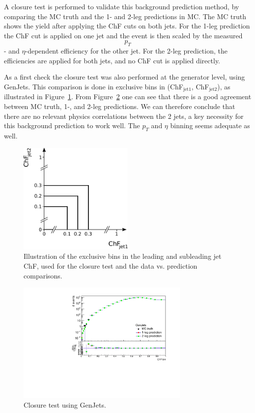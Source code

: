 A closure test is performed to validate this background prediction method, by comparing the MC truth and the 1- and 2-leg predictions in MC. The MC truth shows the yield after applying the ChF cuts on both jets. For the 1-leg prediction the ChF cut is applied on one jet and the event is then scaled by the measured $$p_T$$- and $\eta$-dependent efficiency for the other jet. For the 2-leg prediction, the efficiencies are applied for both jets, and no ChF cut is applied directly.

As a first check the closure test was also performed at the generator level, using GenJets. This comparison is done in exclusive bins in (ChF$_{\mathrm{jet 1}}$, ChF$_{\mathrm{jet 2}}$), as illustrated in Figure~\ref{fig:excl_binning}. From Figure~\ref{fig:closuretest_GenJets} one can see that there is a good agreement between MC truth, 1-, and 2-leg predictions. We can therefore conclude that there are no relevant physics correlations between the 2 jets, a key necessity for this background prediction to work well. The $p_T$ and $\eta$ binning seems adequate as well.

\begin{figure}[h]
  \centering
  \includegraphics[width=0.5\textwidth]{figures/exclusive_binning.pdf}\hfill%
  \caption{Illustration of the exclusive bins in the leading and subleading jet ChF, used for the closure test and the data vs. prediction comparisons.}
  \label{fig:excl_binning}
\end{figure}

\begin{figure}[h]
  \centering
  \includegraphics[width=0.75\textwidth]{figures/closure_test_QCD_GenJets_exclusive_correct.pdf}\hfill%
  \caption{Closure test using GenJets.}
  \label{fig:closuretest_GenJets}
\end{figure}

